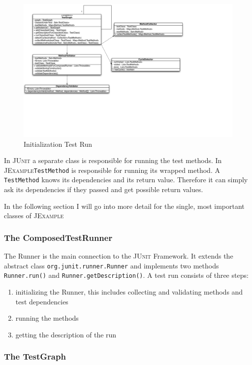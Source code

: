 \documentclass[11pt]{article}
\newcommand{\JUnit}{\textsc{JUnit}\xspace}
\newcommand{\JExample}{\textsc{JExample}\xspace}
\begin{document}
\begin{figure}[htbp]
 \includegraphics[width=20.0cm]{classdiagramInit.pdf}
 \caption{Initialization Test Run}
 \label{fig:classDiagInit}
\end{figure}

In \JUnit a separate class is responsible for running the test methods. In \JExample \verb|TestMethod| is responsible for running its wrapped method. A \verb|TestMethod| knows its dependencies and its return value. Therefore it can simply ask its dependencies if they passed and get possible return values.

In the following section I will go into more detail for the single, most important classes of \JExample

\subsubsection{The ComposedTestRunner}

The Runner is the main connection to the \JUnit Framework. It extends the abstract class \verb|org.junit.runner.Runner| and implements two methods \verb|Runner.run()| and \verb|Runner.getDescription()|. A test run consists of three steps:
\begin{enumerate}
 \item initializing the Runner, this includes collecting and validating methods and test dependencies
 \item running the methods
 \item getting the description of the run
\end{enumerate}

\subsubsection{The TestGraph}
\end{document}
